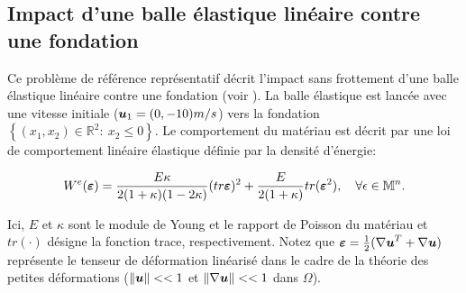 \subsection{Impact d'une balle élastique linéaire contre une fondation} \label{num_ex1}
Ce problème de référence représentatif décrit l'impact sans frottement d'une balle élastique linéaire contre une fondation (voir \cite{khenous2006discretization}). 
La balle élastique est lancée avec une vitesse initiale ($\mbox{\boldmath{$u$}}_1=(0,-10) m/s$) vers la fondation\\
$\left\{(x_1,x_2)\in \mathbb{R}^2:  \ x_2 \leq 0 \right\}$. Le comportement du matériau est décrit par une loi de comportement linéaire élastique définie par la densité d'énergie:

\begin{equation}
	W^e(\mbox{\boldmath{$\varepsilon$}})=\frac{E\kappa}{2(1+\kappa)(1-2\kappa)} (tr
	\mbox{\boldmath{$\varepsilon$}})^2 +\frac{E}{2(1+\kappa)} tr(\mbox{\boldmath{$\varepsilon$}}^2), \quad \forall
	\epsilon \in \mathbb{M}^n.
\end{equation}

Ici, $E$ et $\kappa$ sont le module de Young et le rapport de Poisson du matériau et $tr(\cdot)$ désigne la fonction trace, respectivement. Notez que $\mbox{\boldmath{$\varepsilon$}} = \frac{1}{2} ({\nabla \mbox{\boldmath{$u$}}}^T + \nabla \mbox{\boldmath{$u$}})$ représente le tenseur de déformation linéarisé dans le cadre de la théorie des petites déformations ($\|\mbox{\boldmath{$u$}}\|<< 1$ et $\|\nabla \mbox{\boldmath{$u$}}\| << 1$ dans $\Omega$).

